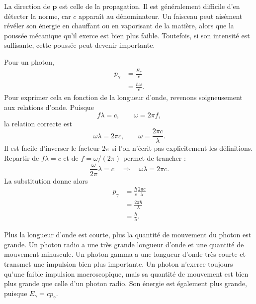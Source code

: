 La direction de \(\mathbf p\) est celle de la propagation. Il est généralement difficile d’en détecter la norme, car \(c\) apparaît au dénominateur. Un faisceau peut aisément révéler son énergie en chauffant ou en vaporisant de la matière, alors que la poussée mécanique qu’il exerce est bien plus faible. Toutefois, si son intensité est suffisante, cette poussée peut devenir importante.

Pour un photon,
\begin{align}
p_\gamma
&=\frac{E_\gamma}{c}\\
&=\frac{\hbar\omega}{c}.
\end{align}
Pour exprimer cela en fonction de la longueur d’onde, revenons soigneusement aux relations d’onde. Puisque
\begin{equation}
f\lambda=c,
\qquad
\omega=2\pi f,
\end{equation}
la relation correcte est
\begin{equation}
\omega\lambda=2\pi c,
\qquad
\omega=\frac{2\pi c}{\lambda}.
\end{equation}
Il est facile d’inverser le facteur \(2\pi\) si l’on n’écrit pas explicitement les définitions. Repartir de \(f\lambda=c\) et de \(f=\omega/(2\pi)\) permet de trancher :
\begin{equation}
\frac{\omega}{2\pi}\lambda=c
\quad\Longrightarrow\quad
\omega\lambda=2\pi c.
\end{equation}
La substitution donne alors
\begin{align}
p_\gamma
&=\frac{\hbar}{c}\frac{2\pi c}{\lambda}\\
&=\frac{2\pi\hbar}{\lambda}\\
&=\frac{h}{\lambda}.
\end{align}

\begin{classroomqa}
\end{classroomqa}

Plus la longueur d’onde est courte, plus la quantité de mouvement du photon est grande. Un photon radio a une très grande longueur d’onde et une quantité de mouvement minuscule. Un photon gamma a une longueur d’onde très courte et transmet une impulsion bien plus importante. Un photon n’exerce toujours qu’une faible impulsion macroscopique, mais sa quantité de mouvement est bien plus grande que celle d’un photon radio. Son énergie est également plus grande, puisque \(E_\gamma=cp_\gamma\).

